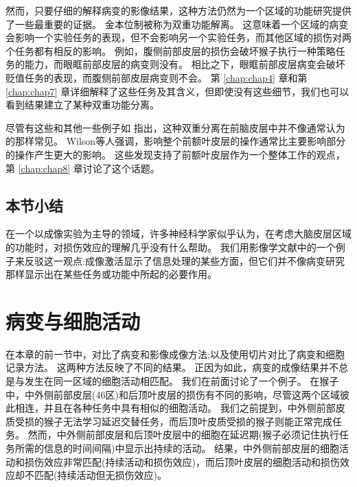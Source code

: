 \par
然而，只要仔细的解释病变的影像结果，这种方法仍然为一个区域的功能研究提供了一些最重要的证据。
金本位制被称为双重功能解离。
这意味着一个区域的病变会影响一个实验任务的表现，但不会影响另一个实验任务，而其他区域的损伤对两个任务都有相反的影响。
例如，腹侧前部皮层的损伤会破坏猴子执行一种策略任务的能力\cite{baxter2009ventrolateral}，而眼眶前部皮层的病变则没有\cite{baxter2007asymmetry,baxter2007orbital}。
相比之下，眼眶前部皮层病变会破坏贬值任务的表现\cite{izquierdo2004bilateral}，而腹侧前部皮层病变则不会\cite{baxter2009ventrolateral}。
第 \ref{chap:chap4} 章和第 \ref{chap:chap7} 章详细解释了这些任务及其含义，但即使没有这些细节，我们也可以看到结果建立了某种双重功能分离。


\par
尽管有这些和其他一些例子如 \cite{gaffan2002interaction}指出，这种双重分离在前脑皮层中并不像通常认为的那样常见。
Wilson等人\cite{wilson2010functional}强调，影响整个前额叶皮层的操作通常比主要影响部分的操作产生更大的影响。
这些发现支持了前额叶皮层作为一个整体工作的观点，第 \ref{chap:chap8} 章讨论了这个话题。


\subsection{本节小结}

在一个以成像实验为主导的领域，许多神经科学家似乎认为，在考虑大脑皮层区域的功能时，对损伤效应的理解几乎没有什么帮助。
我们用影像学文献中的一个例子来反驳这一观点:成像激活显示了信息处理的某些方面，但它们并不像病变研究那样显示出在某些任务或功能中所起的必要作用。


\section{病变与细胞活动}

在本章的前一节中，对比了病变和影像成像方法;以及使用切片对比了病变和细胞记录方法。
这两种方法反映了不同的结果。
正因为如此，病变的成像结果并不总是与发生在同一区域的细胞活动相匹配。
我们在前面讨论了一个例子。
在猴子中，中外侧前部皮层(46区)和后顶叶皮层的损伤有不同的影响，尽管这两个区域彼此相连，并且在各种任务中具有相似的细胞活动。
我们之前提到，中外侧前部皮质受损的猴子无法学习延迟交替任务，而后顶叶皮质受损的猴子则能正常完成任务。
然而，中外侧前部皮层\cite{KOJIMA1984229}和后顶叶皮层\cite{chafee1998matching}中的细胞在延迟期(猴子必须记住执行任务所需的信息的时间间隔)中显示出持续的活动。
结果，中外侧前部皮层的细胞活动和损伤效应非常匹配(持续活动和损伤效应)，而后顶叶皮层的细胞活动和损伤效应却不匹配(持续活动但无损伤效应)。


